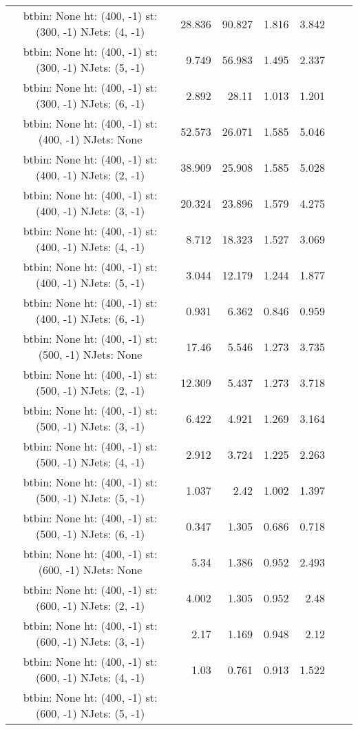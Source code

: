 \documentclass[12pt]{paper}
\begin{document}
\begin{landscape}
\begin{longtable}{c|r|r|r|r|r|r}
btbin:  None ht:  (400, -1) st:  (300, -1) NJets:  (4, -1)
 & 28.836 & 90.827 & 1.816 & 3.842\\
btbin:  None ht:  (400, -1) st:  (300, -1) NJets:  (5, -1)
 & 9.749 & 56.983 & 1.495 & 2.337\\
btbin:  None ht:  (400, -1) st:  (300, -1) NJets:  (6, -1)
 & 2.892 & 28.11 & 1.013 & 1.201\\
btbin:  None ht:  (400, -1) st:  (400, -1) NJets:  None
 & 52.573 & 26.071 & 1.585 & 5.046\\
btbin:  None ht:  (400, -1) st:  (400, -1) NJets:  (2, -1)
 & 38.909 & 25.908 & 1.585 & 5.028\\
btbin:  None ht:  (400, -1) st:  (400, -1) NJets:  (3, -1)
 & 20.324 & 23.896 & 1.579 & 4.275\\
btbin:  None ht:  (400, -1) st:  (400, -1) NJets:  (4, -1)
 & 8.712 & 18.323 & 1.527 & 3.069\\
btbin:  None ht:  (400, -1) st:  (400, -1) NJets:  (5, -1)
 & 3.044 & 12.179 & 1.244 & 1.877\\
btbin:  None ht:  (400, -1) st:  (400, -1) NJets:  (6, -1)
 & 0.931 & 6.362 & 0.846 & 0.959\\
btbin:  None ht:  (400, -1) st:  (500, -1) NJets:  None
 & 17.46 & 5.546 & 1.273 & 3.735\\
btbin:  None ht:  (400, -1) st:  (500, -1) NJets:  (2, -1)
 & 12.309 & 5.437 & 1.273 & 3.718\\
btbin:  None ht:  (400, -1) st:  (500, -1) NJets:  (3, -1)
 & 6.422 & 4.921 & 1.269 & 3.164\\
btbin:  None ht:  (400, -1) st:  (500, -1) NJets:  (4, -1)
 & 2.912 & 3.724 & 1.225 & 2.263\\
btbin:  None ht:  (400, -1) st:  (500, -1) NJets:  (5, -1)
 & 1.037 & 2.42 & 1.002 & 1.397\\
btbin:  None ht:  (400, -1) st:  (500, -1) NJets:  (6, -1)
 & 0.347 & 1.305 & 0.686 & 0.718\\
btbin:  None ht:  (400, -1) st:  (600, -1) NJets:  None
 & 5.34 & 1.386 & 0.952 & 2.493\\
btbin:  None ht:  (400, -1) st:  (600, -1) NJets:  (2, -1)
 & 4.002 & 1.305 & 0.952 & 2.48\\
btbin:  None ht:  (400, -1) st:  (600, -1) NJets:  (3, -1)
 & 2.17 & 1.169 & 0.948 & 2.12\\
btbin:  None ht:  (400, -1) st:  (600, -1) NJets:  (4, -1)
 & 1.03 & 0.761 & 0.913 & 1.522\\
btbin:  None ht:  (400, -1) st:  (600, -1) NJets:  (5, -1)

\end{longtable}
\end{landscape}
\end{document}
